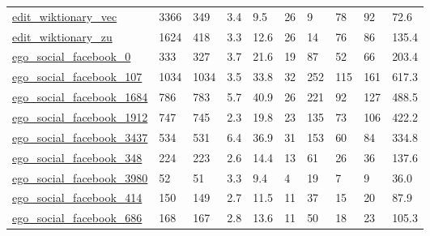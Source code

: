\begin{longtable}{llllllllll}
 \href{http://konect.cc/networks/edit-frwiktionary}{edit\_wiktionary\_vec}                                                    & 3366       & 349   & 3.4    & 9.5    & 26    & 9      & 78     & 92     & 72.6    \\
 \href{http://konect.cc/networks/edit-frwiktionary}{edit\_wiktionary\_zu}                                                     & 1624       & 418   & 3.3    & 12.6   & 26    & 14     & 76     & 86     & 135.4   \\
 \href{http://snap.stanford.edu/data/egonets-Facebook.html}{ego\_social\_facebook\_0}                                          & 333        & 327   & 3.7    & 21.6   & 19    & 87     & 52     & 66     & 203.4   \\
 \href{http://snap.stanford.edu/data/egonets-Facebook.html}{ego\_social\_facebook\_107}                                        & 1034       & 1034  & 3.5    & 33.8   & 32    & 252    & 115    & 161    & 617.3   \\
 \href{http://snap.stanford.edu/data/egonets-Facebook.html}{ego\_social\_facebook\_1684}                                       & 786        & 783   & 5.7    & 40.9   & 26    & 221    & 92     & 127    & 488.5   \\
 \href{http://snap.stanford.edu/data/egonets-Facebook.html}{ego\_social\_facebook\_1912}                                       & 747        & 745   & 2.3    & 19.8   & 23    & 135    & 73     & 106    & 422.2   \\
 \href{http://snap.stanford.edu/data/egonets-Facebook.html}{ego\_social\_facebook\_3437}                                       & 534        & 531   & 6.4    & 36.9   & 31    & 153    & 60     & 84     & 334.8   \\
 \href{http://snap.stanford.edu/data/egonets-Facebook.html}{ego\_social\_facebook\_348}                                        & 224        & 223   & 2.6    & 14.4   & 13    & 61     & 26     & 36     & 137.6   \\
 \href{http://snap.stanford.edu/data/egonets-Facebook.html}{ego\_social\_facebook\_3980}                                       & 52         & 51    & 3.3    & 9.4    & 4     & 19     & 7      & 9      & 36.0    \\
 \href{http://snap.stanford.edu/data/egonets-Facebook.html}{ego\_social\_facebook\_414}                                        & 150        & 149   & 2.7    & 11.5   & 11    & 37     & 15     & 20     & 87.9    \\
 \href{http://snap.stanford.edu/data/egonets-Facebook.html}{ego\_social\_facebook\_686}                                        & 168        & 167   & 2.8    & 13.6   & 11    & 50     & 18     & 23     & 105.3   \\

\end{longtable}
